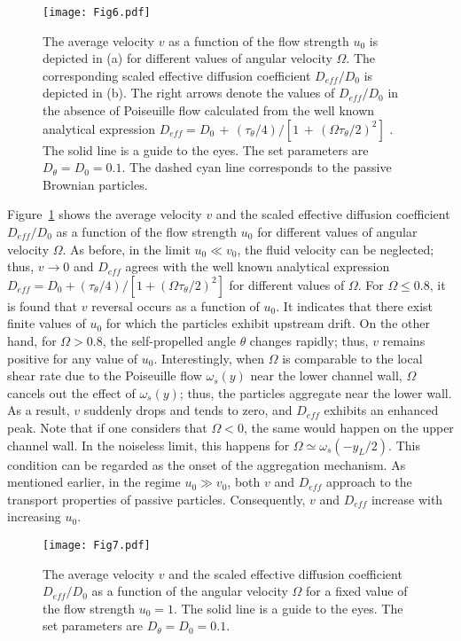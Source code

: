 \documentclass[aps,pre,preprint,superscriptaddress,amsmath,amssymb,nofootinbib]{revtex4}
\begin{document}
\begin{figure}[t]
\centering
\texttt{[image: Fig6.pdf]}
\caption{The average velocity $v$ as a function of the flow strength $u_0$ is depicted in (a) for different values of angular velocity $\Omega$. 
The corresponding scaled effective diffusion coefficient $D_{eff}/D_0$ is depicted in (b). 
The right arrows denote the values of $D_{eff}/D_0$ in the absence of Poiseuille flow calculated from the well known analytical expression $D_{eff} = D_0 \, + \, (\tau_\theta/4)/[1 \, + \, (\Omega \tau_\theta/2)^2]$ \cite{Teeffelen_PRE, Ebbens_PRE}.  The solid line is a guide to the eyes.
The set parameters are $D_\theta = D_0 = 0.1$.
The dashed cyan line corresponds to the passive Brownian particles.}
\label{fig:graph6}
\end{figure}

Figure~\ref{fig:graph6} shows the average velocity $v$ and the scaled effective diffusion coefficient $D_{eff}/D_0$ as a function of the flow strength $u_0$ for different values of angular velocity $\Omega$. 
As before, in the limit $u_0 \ll v_0$, the fluid velocity can be neglected; thus, $v \to 0$ and $D_{eff}$ agrees with the well known analytical expression  $D_{eff} = D_0 + (\tau_\theta/4)/[1 + (\Omega \tau_\theta/2)^2]$ \cite{Teeffelen_PRE, Ebbens_PRE} for different values of $\Omega$.
For $\Omega \le 0.8$, it is found that $v$ reversal occurs as a function of $u_0$.
It indicates that there exist finite values of $u_0$ for which the particles exhibit upstream drift. 
On the other hand, for $\Omega > 0.8$, the self-propelled angle $\theta$ changes rapidly; thus, $v$ remains positive for any value of $u_0$. 
Interestingly, when $\Omega$ is comparable to the local shear rate due to the Poiseuille flow $\omega_s(y)$  near the lower channel wall, $\Omega$ cancels out the effect of $\omega_s(y)$; thus, the particles aggregate near the lower wall. 
As a result, $v$ suddenly drops and tends to zero, and $D_{eff}$ exhibits an enhanced peak. 
Note that if one considers that $\Omega < 0$, the same would happen on the upper channel wall. 
In the noiseless limit, this happens for $\Omega \simeq \omega_s(-y_L/2)$. 
This condition can be regarded as the onset of the aggregation mechanism.
As mentioned earlier, in the regime $u_0 \gg v_0$, both $v$ and $D_{eff}$ approach to the transport properties of passive particles. 
Consequently, $v$ and $D_{eff}$ increase with increasing $u_0$.

\begin{figure}[t]
\centering
\texttt{[image: Fig7.pdf]}
\caption{The average velocity $v$ and the scaled effective diffusion coefficient $D_{eff}/D_0$ as a function of the angular velocity $\Omega$ for a fixed value of the flow strength $u_0 = 1$.  The solid line is a guide to the eyes. The set parameters are $D_\theta = D_0 = 0.1$.}
\label{fig:graph7}
\end{figure}
\end{document}
